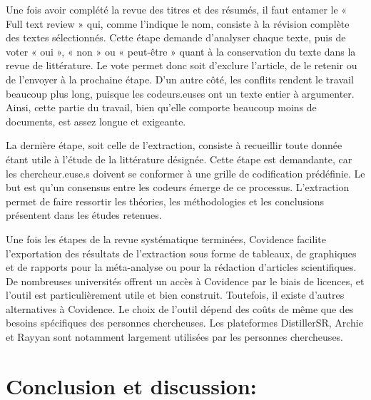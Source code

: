 \documentclass[
  letterpaper,
]{scrbook}
\begin{document}
Une fois avoir complété la revue des titres et des résumés, il faut
entamer le « Full text review » qui, comme l'indique le nom, consiste à
la révision complète des textes sélectionnés. Cette étape demande
d'analyser chaque texte, puis de voter « oui », « non » ou « peut-être »
quant à la conservation du texte dans la revue de littérature. Le vote
permet donc soit d'exclure l'article, de le retenir ou de l'envoyer à la
prochaine étape. D'un autre côté, les conflits rendent le travail
beaucoup plus long, puisque les codeurs.euses ont un texte entier à
argumenter. Ainsi, cette partie du travail, bien qu'elle comporte
beaucoup moins de documents, est assez longue et exigeante.

La dernière étape, soit celle de l'extraction, consiste à recueillir
toute donnée étant utile à l'étude de la littérature désignée. Cette
étape est demandante, car les chercheur.euse.s doivent se conformer à
une grille de codification prédéfinie. Le but est qu'un consensus entre
les codeurs émerge de ce processus. L'extraction permet de faire
ressortir les théories, les méthodologies et les conclusions présentent
dans les études retenues.

Une fois les étapes de la revue systématique terminées, Covidence
facilite l'exportation des résultats de l'extraction sous forme de
tableaux, de graphiques et de rapports pour la méta-analyse ou pour la
rédaction d'articles scientifiques. De nombreuses universités offrent un
accès à Covidence par le biais de licences, et l'outil est
particulièrement utile et bien construit. Toutefois, il existe d'autres
alternatives à Covidence. Le choix de l'outil dépend des coûts de même
que des besoins spécifiques des personnes chercheuses. Les plateformes
DistillerSR, Archie et Rayyan sont notamment largement utilisées par les
personnes chercheuses.

\hypertarget{conclusion-et-discussion}{%
\section{Conclusion et discussion:}\label{conclusion-et-discussion}}
\end{document}
